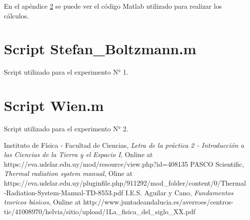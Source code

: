 \documentclass[a4paper]{article}
\begin{document}
En el apéndice \ref{appendix:wien} se puede ver el código Matlab utilizado para realizar los cálculos.

\newpage
\begin{appendices}

\section{Script Stefan\_Boltzmann.m}
\label{appendix:sb}

Script utilizado para el experimento N° 1.



\newpage
\section{Script Wien.m}
\label{appendix:wien}

Script utilizado para el experimento N° 2.



\end{appendices}

\begin{thebibliography}{9}
  Instituto de Física - Facultad de Ciencias,
  \emph{Letra de la práctica 2 - Introducción a las Ciencias de la Tierra y el Espacio I},
  Online at https://eva.udelar.edu.uy/mod/resource/view.php?id=408135
  PASCO Scientific,
  \emph{Thermal radiation system manual},
  Oline at https://eva.udelar.edu.uy/pluginfile.php/911292/mod\_folder/content/0/Thermal-Radiation-System-Manual-TD-8553.pdf
  I.E.S. Aguilar y Cano,
  \emph{Fundamentos teoricos básicos},
  Online at http://www.juntadeandalucia.es/averroes/centros-tic/41008970/helvia/sitio/upload/1La\_fisica\_del\_siglo\_XX.pdf
\end{thebibliography}
\end{document}
